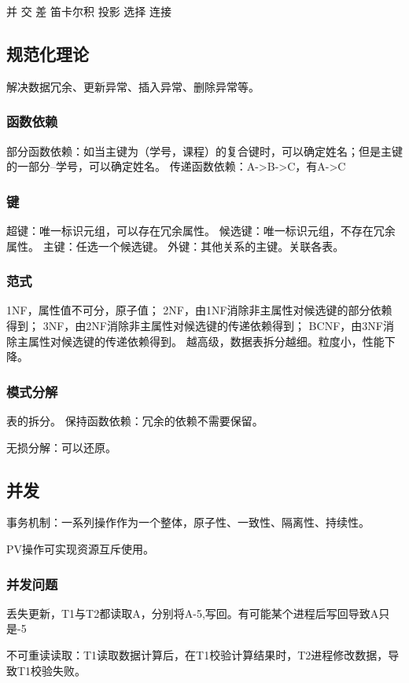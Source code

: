 \documentclass[UTF8]{article}
\begin{document}
并
交
差
笛卡尔积
投影
选择
连接

\subsection{规范化理论}
解决数据冗余、更新异常、插入异常、删除异常等。

\subsubsection{函数依赖}
部分函数依赖：如当主键为（学号，课程）的复合键时，可以确定姓名；但是主键的一部分--学号，可以确定姓名。
传递函数依赖：A->B->C，有A->C


\subsubsection{键}
超键：唯一标识元组，可以存在冗余属性。
候选键：唯一标识元组，不存在冗余属性。
主键：任选一个候选键。
外键：其他关系的主键。关联各表。

\subsubsection{范式}
1NF，属性值不可分，原子值；
2NF，由1NF消除非主属性对候选键的部分依赖得到；
3NF，由2NF消除非主属性对候选键的传递依赖得到；
BCNF，由3NF消除主属性对候选键的传递依赖得到。
越高级，数据表拆分越细。粒度小，性能下降。

\subsubsection{模式分解}
表的拆分。
保持函数依赖：冗余的依赖不需要保留。

无损分解：可以还原。

\subsection{并发}
事务机制：一系列操作作为一个整体，原子性、一致性、隔离性、持续性。

PV操作可实现资源互斥使用。

\subsubsection{并发问题}

丢失更新，T1与T2都读取A，分别将A-5,写回。有可能某个进程后写回导致A只是-5

不可重读读取：T1读取数据计算后，在T1校验计算结果时，T2进程修改数据，导致T1校验失败。
\end{document}

